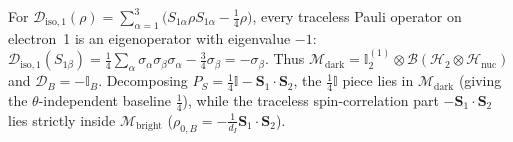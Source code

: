 \documentclass[onecolumn,10pt,notitlepage,amsmath,amssymb,floatfix]{revtex4-2}
\theoremstyle{plain}
\theoremstyle{definition}
\newcommand{\PS}{P_S}
\begin{document}
For $\mathcal{D}_{\mathrm{iso},1}(\rho) = \sum_{\alpha=1}^3 \big(S_{1\alpha}\rho S_{1\alpha} - \frac{1}{4}\rho\big)$, every traceless Pauli operator on electron~1 is an eigenoperator with eigenvalue $-1$: $\mathcal{D}_{\mathrm{iso},1}(S_{1\beta}) = \frac{1}{4}\sum_\alpha \sigma_\alpha \sigma_\beta \sigma_\alpha - \frac{3}{4}\sigma_\beta = -\sigma_\beta$. Thus $\mathcal{M}_{\mathrm{dark}} = \mathbb{I}_2^{(1)} \otimes \mathcal{B}(\mathcal{H}_2 \otimes \mathcal{H}_{\mathrm{nuc}})$ and $\mathcal{D}_B = -\mathbb{I}_B$. Decomposing $\PS = \frac{1}{4}\mathbb{I} - \mathbf{S}_1\cdot\mathbf{S}_2$, the $\frac{1}{4}\mathbb{I}$ piece lies in $\mathcal{M}_{\mathrm{dark}}$ (giving the $\theta$-independent baseline $\frac{1}{4}$), while the traceless spin-correlation part $-\mathbf{S}_1\cdot\mathbf{S}_2$ lies strictly inside $\mathcal{M}_{\mathrm{bright}}$ ($\rho_{0,B} = -\frac{1}{d_I}\mathbf{S}_1\cdot\mathbf{S}_2$).
\end{document}
